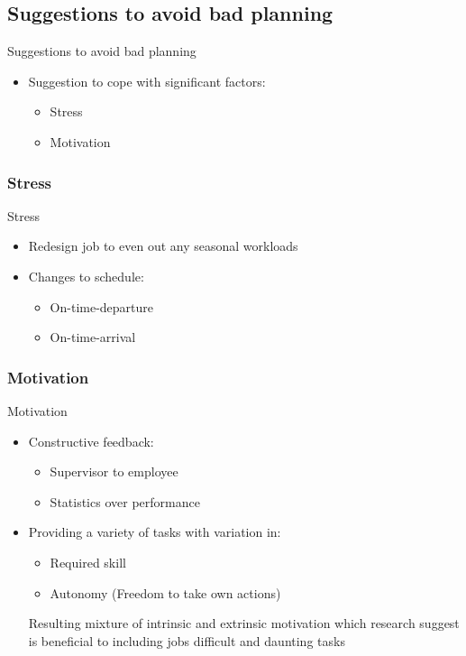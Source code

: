 \subsection{Suggestions to avoid bad planning}
\begin{frame}{Suggestions to avoid bad planning}{}
    \begin{itemize}
        \item Suggestion to cope with significant factors:
            \begin{itemize}
            \item Stress
            \item Motivation
        \end{itemize}
    \end{itemize}
\end{frame}

\subsubsection{Stress}
\begin{frame}{Stress}{}
    \begin{itemize}
        \item Redesign job to even out any seasonal workloads
        \item Changes to schedule:
            \begin{itemize}
                \item On-time-departure
                \item On-time-arrival
            \end{itemize}
    \end{itemize}
\end{frame}

\subsubsection{Motivation}
\begin{frame}{Motivation}{}
    \begin{itemize}
        \item Constructive feedback:
            \begin{itemize}
                \item Supervisor to employee
                \item Statistics over performance
            \end{itemize}
        \item Providing a variety of tasks with variation in:
            \begin{itemize}
                \item Required skill
                \item Autonomy (Freedom to take own actions)
            \end{itemize}
                        Resulting mixture of intrinsic and extrinsic motivation which research suggest is beneficial to including jobs difficult and daunting tasks
    \end{itemize}
\end{frame}